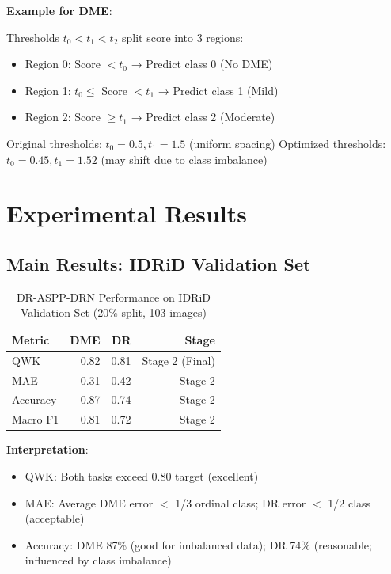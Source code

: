 \textbf{Example for DME}:

Thresholds $t_0 < t_1 < t_2$ split score into 3 regions:
\begin{itemize}
    \item Region 0: Score $< t_0$ → Predict class 0 (No DME)
    \item Region 1: $t_0 \leq$ Score $< t_1$ → Predict class 1 (Mild)
    \item Region 2: Score $\geq t_1$ → Predict class 2 (Moderate)
\end{itemize}

Original thresholds: $t_0 = 0.5, t_1 = 1.5$ (uniform spacing)
Optimized thresholds: $t_0 = 0.45, t_1 = 1.52$ (may shift due to class imbalance)

\newpage

\section{Experimental Results}

\subsection{Main Results: IDRiD Validation Set}

\begin{table}[H]
\centering
\small
\caption{DR-ASPP-DRN Performance on IDRiD Validation Set (20\% split, 103 images)}
\begin{tabular}{|l|r|r|r|}
\hline
\textbf{Metric} & \textbf{DME} & \textbf{DR} & \textbf{Stage} \\
\hline
QWK & 0.82 & 0.81 & Stage 2 (Final) \\
MAE & 0.31 & 0.42 & Stage 2 \\
Accuracy & 0.87 & 0.74 & Stage 2 \\
Macro F1 & 0.81 & 0.72 & Stage 2 \\
\hline
\end{tabular}
\end{table}

\textbf{Interpretation}:
\begin{itemize}
    \item QWK: Both tasks exceed 0.80 target (excellent)
    \item MAE: Average DME error $<$ 1/3 ordinal class; DR error $<$ 1/2 class (acceptable)
    \item Accuracy: DME 87\% (good for imbalanced data); DR 74\% (reasonable; influenced by class imbalance)
\end{itemize}

